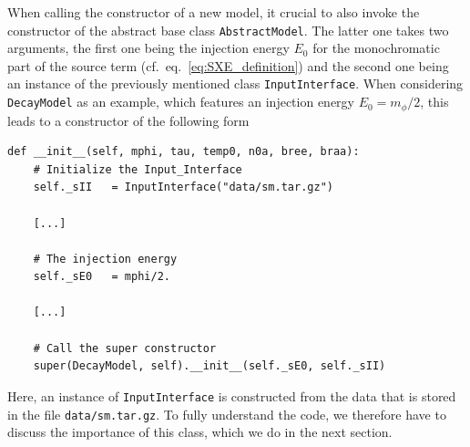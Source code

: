 \documentclass[11pt,a4paper]{article}
\begin{document}
When calling the constructor of a new model, it crucial to also invoke the constructor of the abstract base class \texttt{AbstractModel}. The latter one takes two arguments, the first one being the injection energy $E_0$ for the monochromatic part of the source term (cf.\ eq.~\eqref{eq:SXE_definition}) and the second one being an instance of the previously mentioned class \texttt{InputInterface}. When considering \texttt{DecayModel} as an example, which features an injection energy $E_0 = m_\phi/2$, this leads to a constructor of the following form
\begin{lstlisting}
def __init__(self, mphi, tau, temp0, n0a, bree, braa):
	# Initialize the Input_Interface
	self._sII   = InputInterface("data/sm.tar.gz")

	[...]

	# The injection energy
	self._sE0   = mphi/2.

	[...]

	# Call the super constructor
	super(DecayModel, self).__init__(self._sE0, self._sII)
\end{lstlisting}
Here, an instance of \texttt{InputInterface} is constructed from the data that is stored in the file \texttt{data/sm.tar.gz}. To fully understand the code, we therefore have to discuss the importance of this class, which we do in the next section.
\end{document}
